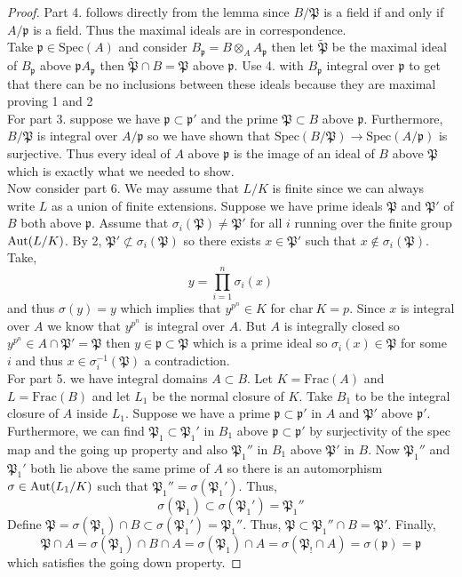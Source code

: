\documentclass[12pt]{article}
\newcommand{\Aut}[1]{\mathrm{Aut} \small(#1 \small)}
\newcommand{\Frac}[1]{\mathrm{Frac}\left(#1\right)}
\newcommand{\spec}[1]{\mathrm{Spec}\left( #1 \right)}
\newcommand{\p}{\mathfrak{p}}
\renewcommand{\P}{\mathfrak{P}}
\theoremstyle{remark}
\theoremstyle{definition}
\begin{document}
\begin{proof}
Part 4. follows directly from the lemma since $B / \mathfrak{P}$ is a field if and only if $A / \p$ is a field. Thus the maximal ideals are in correspondence.
\bigskip\\
Take $\p \in \spec{A}$ and consider $B_{\p} = B \otimes_A A_{\p}$ then let $\tilde{\P}$ be the maximal ideal of $B_{\p}$ above $\p A_\p$ then $\tilde{\P} \cap B = \P$ above $\p$. Use 4. with $B_{\p}$ integral over $\p$ to get that there can be no inclusions between these ideals because they are maximal proving 1 and 2
\bigskip\\
For part 3. suppose we have $\p \subset \p'$ and the prime $\P \subset B$ above $\p$. Furthermore, $B/\P$ is integral over $A / \p$ so we have shown that $\spec{B / \P} \to \spec{A / \p}$ is surjective. Thus every ideal of $A$ above $\p$ is the image of an ideal of $B$ above $\P$ which is exactly what we needed to show.
\bigskip\\
Now consider part 6. We may assume that $L / K$ is finite since we can always write $L$ as a union of finite extensions. Suppose we have prime ideals $\P$ and $\P'$ of $B$ both above $\p$. Assume that $\sigma_i(\P) \neq \P'$ for all $i$ running over the finite group $\Aut{L/K}$. By 2, $\P' \not\subset \sigma_i(\P)$ so there exists $x \in \P'$ such that $x \notin \sigma_i(\P)$. Take,
\[ y = \prod_{i = 1}^n \sigma_i(x) \]
and thus $\sigma(y) = y$ which implies that $y^{p^n} \in K$ for $\mathrm{char} \: K = p$. Since $x$ is integral over $A$ we know that $y^{p^n}$ is integral over $A$. But $A$ is integrally closed so $y^{p^n} \in A \cap \P' = \P$ then $y \in \p \subset \P$ which is a prime ideal so $\sigma_i(x) \in \P$ for some $i$ and thus $x \in \sigma_i^{-1}(\P)$ a contradiction. 
\bigskip\\
For part 5. we have integral domains $A \subset B$. Let $K = \Frac{A}$ and $L = \Frac{B}$ and let $L_1$ be the normal closure of $K$. Take $B_1$ to be the integral closure of $A$ inside $L_1$. Suppose we have a prime $\p \subset \p'$ in $A$ and $\P'$ above $\p'$. Furthermore, we can find $\P_1 \subset \P_1'$ in $B_1$ above $\p \subset \p'$ by surjectivity of the spec map and the going up property and also $\P_1''$ in $B_1$ above $\P'$ in $B$. Now $\P_1''$ and $\P_1'$ both lie above the same prime of $A$ so there is an automorphism $\sigma \in \Aut{L_1 / K}$ such that $\P_1'' = \sigma(\P_1')$. Thus,
\[ \sigma(\P_1) \subset \sigma(\P_1') = \P_1'' \]
Define $\P = \sigma(\P_1) \cap B \subset \sigma(\P_1') = \P_1''$. Thus, $\P \subset \P_1'' \cap B = \P'$. Finally,
\[ \P \cap A = \sigma(\P_1) \cap B \cap A = \sigma(\P_1) \cap A = \sigma(\P_! \cap A) = \sigma(\p) = \p \]
which satisfies the going down property.    
\end{proof}
\end{document}
